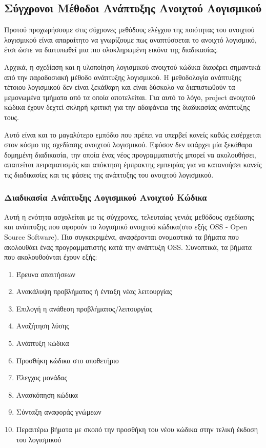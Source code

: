\documentclass[a4paper, 11pt]{article}
\begin{document}
{{\subsection{Σύγχρονοι Μέθοδοι Ανάπτυξης Ανοιχτού Λογισμικού}

Προτού προχωρήσουμε στις σύχρονες μεθόδους ελέγχου της ποιότητας του ανοιχτού λογισμικού είναι απαραίτητο να γνωρίζουμε πως αναπτύσσεται το ανοιχτό λογισμικό, έτσι ώστε να διατυπωθεί μια πιο ολοκληρωμένη εικόνα της διαδικασίας.

Αρχικά, η σχεδίαση και η υλοποίηση λογισμικού ανοιχτού κώδικα διαφέρει σημαντικά από την παραδοσιακή μέθοδο ανάπτυξης λογισμικού. Η μεθοδολογία ανάπτυξης τέτοιου λογισμικού δεν είναι ξεκάθαρη και είναι δύσκολο να διαπιστωθούν τα μεμονωμένα τμήματα από τα οποία αποτελείται. Για αυτό το λόγο, \textlatin{project} ανοιχτού κώδικα έχουν δεχτεί σκληρή κριτική για την αδαφάνεια της διαδικασίας ανάπτυξης τους.

Αυτό είναι και το μαγαλύτερο εμπόδιο που πρέπει να υπερβεί κανείς καθώς εισέρχεται στον κόσμο της σχεδίασης ανοιχτού λογισμικού. Εφόσον δεν υπάρχει μία ξεκάθαρα δομημένη διαδικασία, την οποία ένας νέος προγραμματιστής μπορεί να ακολουθήσει, απαιτείται πειραματισμός και απόκτηση έμπρακτης εμπειρίας για να κατανοήσει κανείς τις διαδικασίες και τις φάσεις της ανάπτυξης του ανοιχτού λογισμικού.

\subsubsection{Διαδικασία Ανάπτυξης Λογισμικού Ανοιχτού Κώδικα}

Αυτή η ενότητα ασχολείται με τις σύγχρονες, τελευταίας γενιάς μεθόδους σχεδίασης και ανάπτυξης που αφορούν το λογισμικό ανοιχτού κώδικα(στο εξής \textlatin{OSS - Open Source Software}). Πιο συγκεκριμένα, αναφέρονται ονομαστικά τα βήματα που ακολουθάει ένας προγραμματιστής κατά την ανάπτυξη \textlatin{OSS}. Συνοπτικά, τα βήματα που ακολουθούνται έχουν εξής:

\begin{enumerate}
    \item Έρευνα απαιτήσεων
    \item Ανακάλυψη προβλήματος ή ένταξη νέας λειτουργίας
    \item Επιλογή η ανάθεση προβλήματος/λειτουργίας
    \item Αναζήτηση λύσης
    \item Ανάπτυξη κώδικα
    \item Προσθήκη κώδικα στο αποθετήριο
    \item Έλεγχος μονάδας
    \item Ανασκόπηση κώδικα
    \item Σύνταξη αναφοράς γνώμεων
    \item Περαιτέρω βήματα με σκοπό την προσθήκη του νέου κώδικα στην τελική έκδοση του λογισμικού
\end{enumerate}

}}
\end{document}
